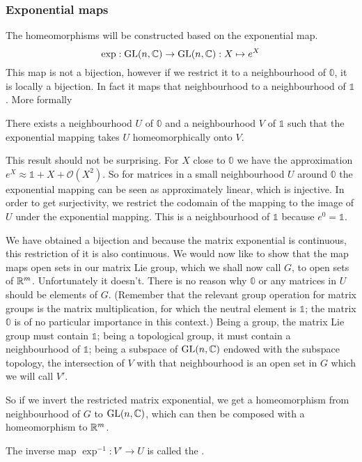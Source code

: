\subsubsection{Exponential maps}
The homeomorphisms will be constructed based on the exponential map.
\[ \exp: \operatorname{GL}(n,\mathbb{C}) \to \operatorname{GL}(n,\mathbb{C}): X \mapsto e^X \]
This map is not a bijection, however if we restrict it to a neighbourhood of $\mathbb{0}$, it is locally a bijection. In fact it maps that neighbourhood to a neighbourhood of $\mathbb{1}$. More formally
\begin{eigenschap}
There exists a neighbourhood $U$ of $\mathbb{0}$ and a neighbourhood $V$ of $\mathbb{1}$ such that the exponential mapping takes $U$ homeomorphically onto $V$.
\end{eigenschap}
This result should not be surprising. For $X$ close to $\mathbb{0}$ we have the approximation $e^{X} \approx \mathbb{1} + X + \mathcal{O}(X^2)$. So for matrices in a small neighbourhood $U$ around $\mathbb{0}$ the exponential mapping can be seen as approximately linear, which is injective. In order to get surjectivity, we restrict the codomain of the mapping to the image of $U$ under the exponential mapping. This is a neighbourhood of $\mathbb{1}$ because $e^0 = \mathbb{1}$. 

We have obtained a bijection and because the matrix exponential is continuous, this restriction of it is also continuous. We would now like to show that the map maps open sets in our matrix Lie group, which we shall now call $G$, to open sets of $\mathbb{R}^{m}$. Unfortunately it doesn't. There is no reason why $\mathbb{0}$ or any matrices in $U$ should be elements of $G$. (Remember that the relevant group operation for matrix groups is the matrix multiplication, for which the neutral element is $\mathbb{1}$; the matrix $\mathbb{0}$ is of no particular importance in this context.) Being a group, the matrix Lie group must contain $\mathbb{1}$; being a topological group, it must contain a neighbourhood of $\mathbb{1}$; being a subspace of $\operatorname{GL}(n,\mathbb{C})$ endowed with the subspace topology, the intersection of $V$ with that neighbourhood is an open set in $G$ which we will call $V'$.

So if we invert the restricted matrix exponential, we get a homeomorphism from  neighbourhood of $G$ to $\operatorname{GL}(n,\mathbb{C})$, which can then be composed with a homeomorphism to $\mathbb{R}^m$.

\begin{definition}
The inverse map $\exp^{-1}: V' \to U$ is called the .
\end{definition}


